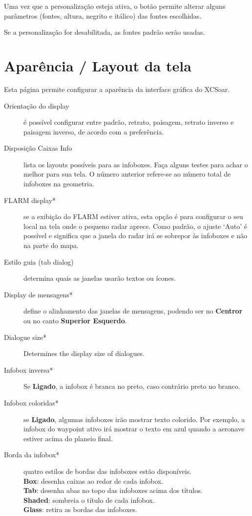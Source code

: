 Uma vez que a personalização esteja ativa, o botão   permite alterar alguns parâmetros (fontes, altura, negrito e itálico) das fontes escolhidas.

Se a personalização for desabilitada, as fontes padrão serão usadas.


\section{Aparência / Layout da tela}\label{sec:interface-appearance}
\label{conf:interface-appearance}

Esta página permite configurar a aparência da interface gráfica do XCSoar.

\begin{description}
\item[Orientação do display] é possível configurar entre padrão, retrato, paisagem, retrato inverso e paisagem inverso, de acordo com a preferência.
\item[Disposição Caixas Info]  lista os layouts possíveis para as infoboxes.  Faça alguns testes para achar o melhor para sua tela.  O número anterior refere-se ao número total de infoboxes na geometria.
\item[FLARM display*]  \label{conf:flarmradar-place}
 se a exibição do FLARM estiver ativa, esta opção é para configurar o seu local na tela onde o pequeno radar aprece.  Como padrão, o ajuste ‘Auto’ é possível e significa que a janela do radar irá se sobrepor às infoboxes e não na parte do mapa.
\item[Estilo guia (tab dialog)]  determina quais as janelas usarão textos ou ícones.
\item[Display de mensagens*]  define o alinhamento das janelas de mensagens, podendo ser no 
  {\bf Centror} ou no canto {\bf Superior Esquerdo}.
\item[Dialogue size*]  Determines the display size of dialogues.
\item[Infobox inversa*]  Se {\bf Ligado}, a infobox é branca no preto, caso contrário preto no branco.
\item[Infobox coloridas*]  se {\bf Ligado}, algumas infoboxes irão mostrar texto colorido.  Por exemplo, a infobox do waypoint ativo irá mostrar o texto em azul quando a aeronave estiver acima do planeio final.
\item[Borda da infobox*]  quatro estilos de bordas das infoboxes estão disponíveis. \\
  {\bf Box}: desenha caixas ao redor de cada infobox. \\
  {\bf Tab}: desenha abas no topo das infoboxes acima dos títulos. \\
  {\bf Shaded}: sombreia o título de cada infobox. \\
  {\bf Glass}: retira as bordas das infoboxes. \\
\end{description}


